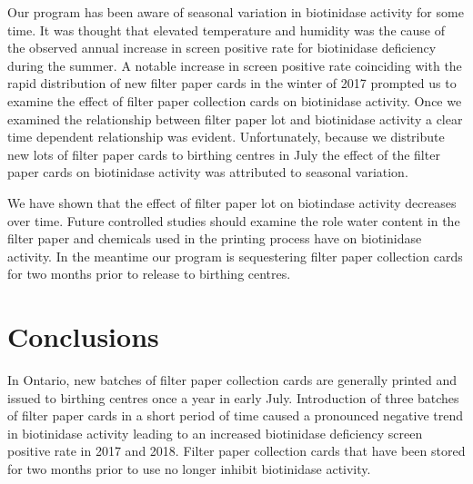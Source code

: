 \documentclass[review]{elsarticle}
\begin{document}
Our program has been aware of seasonal variation in biotinidase
activity for some time. It was thought that elevated temperature and
humidity was the cause of the observed annual increase in screen
positive rate for biotinidase deficiency during the summer. A notable
increase in screen positive rate coinciding with the rapid
distribution of new filter paper cards in the winter of 2017 prompted
us to examine the effect of filter paper collection cards on
biotinidase activity. Once we examined the relationship between filter
paper lot and biotinidase activity a clear time dependent relationship
was evident. Unfortunately, because we distribute new lots of filter
paper cards to birthing centres in July the effect of the filter paper
cards on biotinidase activity was attributed to seasonal variation.

We have shown that the effect of filter paper lot on biotindase
activity decreases over time. Future controlled studies should examine
the role water content in the filter paper and chemicals used in the
printing process have on biotinidase activity. In the meantime our
program is sequestering filter paper collection cards for two months
prior to release to birthing centres.

\section*{Conclusions}
\label{sec:org17a3e97}
In Ontario, new batches of filter paper collection cards are generally
printed and issued to birthing centres once a year in early
July. Introduction of three batches of filter paper cards in a short
period of time caused a pronounced negative trend in biotinidase
activity leading to an increased biotinidase deficiency screen
positive rate in 2017 and 2018. Filter paper collection cards that
have been stored for two months prior to use no longer inhibit
biotinidase activity.
\end{document}
